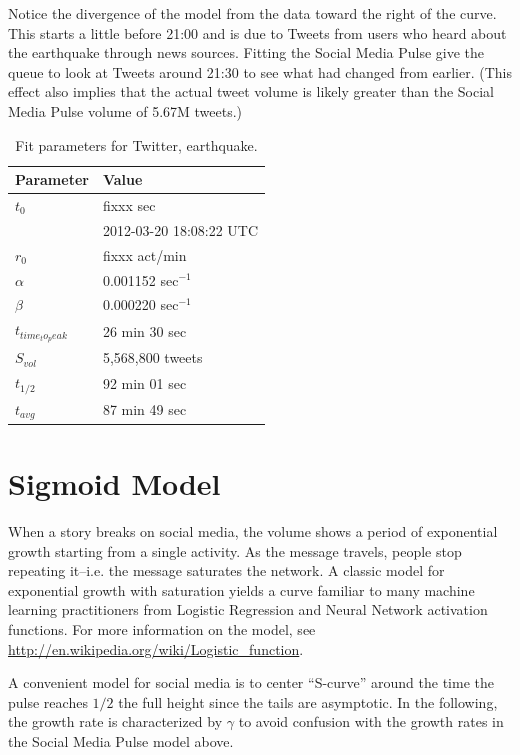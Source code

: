 \documentclass{article}
\begin{document}
Notice the divergence of the model from the data toward the right of the curve. This starts a little before 21:00 and is due to Tweets from users who heard about the earthquake through news sources.  Fitting the Social Media Pulse give the queue to look at Tweets around 21:30 to see what had changed from earlier.  (This effect also implies that the actual tweet volume is likely greater than the Social Media Pulse volume of 5.67M tweets.)

\begin{table}
\caption{Fit parameters for Twitter, earthquake.}
\label{tab:pars}
\begin{tabular}{ | l | l |}
    \hline
    Parameter & Value  \\ \hline
    $t_0$ & fixxx sec\\ 
              & 2012-03-20 18:08:22 UTC\\
    $r_0$ & fixxx act/min\\ 
    $\alpha$ & 0.001152 sec$^{-1}$\\ 
    $\beta$ & 0.000220 sec$^{-1}$\\ \hline
    $t_{time_to_peak}$ & 26 min 30 sec \\ 
    $S_{vol}$ & 5,568,800 tweets \\
    $t_{1/2}$ & 92 min 01 sec \\
    $t_{avg}$ & 87 min 49 sec \\ \hline
\end{tabular}
\end{table}

\section{Sigmoid Model}
\label{sec:sigmodel}

When a story breaks on social media, the volume shows a period of exponential growth starting from a single activity.  As the message
travels, people stop repeating it--i.e. the message saturates the network.  A classic model for exponential growth with saturation yields a curve
familiar to many machine learning practitioners from Logistic Regression and Neural Network activation functions. For more information on the
model, see \url{http://en.wikipedia.org/wiki/Logistic_function}.

A convenient model for social media is to center ``S-curve'' around the time the pulse reaches $1/2$ the full height since the tails
are asymptotic.  In the following, the growth rate is characterized by $\gamma$ to avoid confusion with the growth rates in the 
Social Media Pulse model above. 
\end{document}
